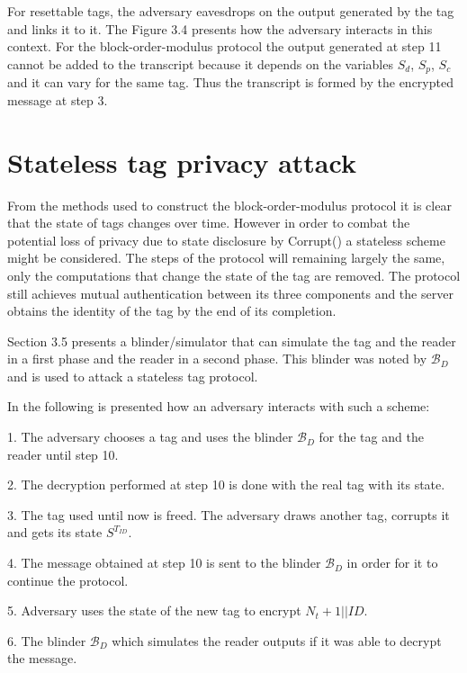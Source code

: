     For resettable tags, the adversary eavesdrops on the output generated by the tag and links it to it. The Figure 3.4 presents how the adversary
    interacts in this context. For the block-order-modulus protocol the output generated at step 11 cannot be added to the transcript because it
    depends on the variables $S_d$, $S_p$, $S_c$ and it can vary for the same tag. Thus the transcript is formed by the encrypted message at step 3.
    
\section{Stateless tag privacy attack}
    From the methods used to construct the block-order-modulus protocol it is clear that the state of tags changes over time. However in order to combat
    the potential loss of privacy due to state disclosure by Corrupt() a stateless scheme might be considered. The steps of the protocol will remaining
    largely the same, only the computations that change the state of the tag are removed. The protocol still achieves mutual authentication between its 
    three components and the server obtains the identity of the tag by the end of its completion. 
    
    Section 3.5 presents a blinder/simulator
    that can simulate the tag and the reader in a first phase and the reader in a second phase. This blinder was noted by $\mathcal{B}_D$ and is used
    to attack a stateless tag protocol.
    
    In the following is presented how an adversary interacts with such a scheme:

    1. The adversary chooses a tag and uses the blinder $\mathcal{B}_D$ for the tag and the reader until step 10.

    2. The decryption performed at step 10 is done with the real tag with its state. 

    3. The tag used until now is freed. The adversary draws another tag, corrupts it and gets its state $S^{T_{ID}}$.

    4. The message obtained at step 10 is sent to the blinder $\mathcal{B}_D$ in order for it to continue the protocol.

    5. Adversary uses the state of the new tag to encrypt $N_t+1||ID$.

    6. The blinder $\mathcal{B}_D$ which simulates the reader outputs if it was able to decrypt the message.

